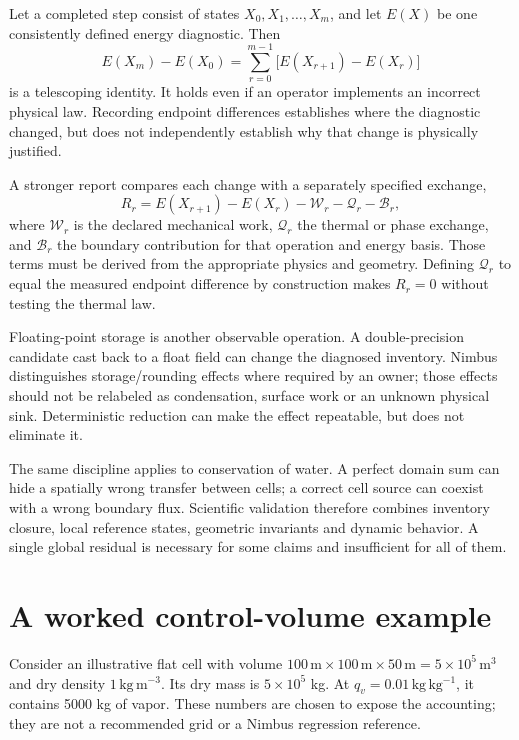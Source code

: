 Let a completed step consist of states $X_0,X_1,\ldots,X_m$, and let
$E(X)$ be one consistently defined energy diagnostic. Then
\[
 E(X_m)-E(X_0)=\sum_{r=0}^{m-1}\big[E(X_{r+1})-E(X_r)\big]
\]
is a telescoping identity. It holds even if an operator implements an incorrect
physical law. Recording endpoint differences establishes where the diagnostic
changed, but does not independently establish why that change is physically
justified.

A stronger report compares each change with a separately specified exchange,
\[
 R_r=E(X_{r+1})-E(X_r)-\mathcal W_r-\mathcal Q_r-\mathcal B_r,
\]
where $\mathcal W_r$ is the declared mechanical work, $\mathcal Q_r$ the thermal
or phase exchange, and $\mathcal B_r$ the boundary contribution for that
operation and energy basis. Those terms must be derived from the appropriate
physics and geometry. Defining $\mathcal Q_r$ to equal the measured endpoint
difference by construction makes $R_r=0$ without testing the thermal law.

Floating-point storage is another observable operation. A double-precision
candidate cast back to a float field can change the diagnosed inventory.
Nimbus distinguishes storage/rounding effects where required by an owner;
those effects should not be relabeled as condensation, surface work or an
unknown physical sink. Deterministic reduction can make the effect repeatable,
but does not eliminate it.

The same discipline applies to conservation of water. A perfect domain sum can
hide a spatially wrong transfer between cells; a correct cell source can coexist
with a wrong boundary flux. Scientific validation therefore combines inventory
closure, local reference states, geometric invariants and dynamic behavior.
A single global residual is necessary for some claims and insufficient for all
of them.

\section{A worked control-volume example}

Consider an illustrative flat cell with volume
$100\,\mathrm m\times100\,\mathrm m\times50\,\mathrm m
=5\times10^5\,\mathrm{m^3}$ and dry density
$1\,\mathrm{kg\,m^{-3}}$. Its dry mass is $5\times10^5$ kg. At
$q_v=0.01\,\mathrm{kg\,kg^{-1}}$, it contains 5000 kg of vapor. These numbers
are chosen to expose the accounting; they are not a recommended grid or a
Nimbus regression reference.

